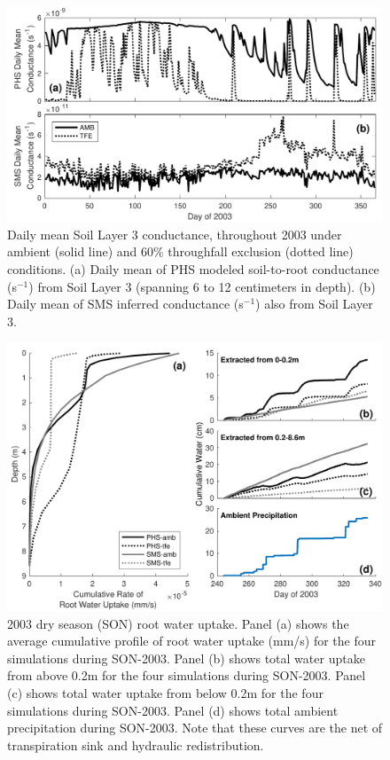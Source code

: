 \documentclass[draft,linenumbers]{agujournal}
\begin{document}
  \clearpage   
  \begin{figure}[h]
     \centering
     \includegraphics[width=30pc]{../figs2/fig6a.pdf}
     \caption{Daily mean Soil Layer 3 conductance, throughout 2003 under ambient (solid line) and 60\% throughfall exclusion (dotted line) conditions.
     (a) Daily mean of PHS modeled soil-to-root conductance (s$^{-1}$) from Soil Layer 3 (spanning 6 to 12 centimeters in depth).
     (b) Daily mean of SMS inferred conductance (s$^{-1}$) also from Soil Layer 3.
     }
     \label{fig:cond2}
  \end{figure}
  
        \clearpage
    \begin{figure}[h]
     \centering
     \includegraphics[width=30pc]{../figs2/fig7.pdf}
     \caption{2003 dry season (SON) root water uptake. 
     Panel (a) shows the average cumulative profile of root water uptake (mm/s) for the four simulations during SON-2003.
     Panel (b) shows total water uptake from above 0.2m for the four simulations during SON-2003.
     Panel (c) shows total water uptake from below 0.2m for the four simulations during SON-2003. 
     Panel (d) shows total ambient precipitation during SON-2003.
     Note that these curves are the net of transpiration sink and hydraulic redistribution.
     }
     \label{fig7}
  \end{figure}
  
\end{document}
